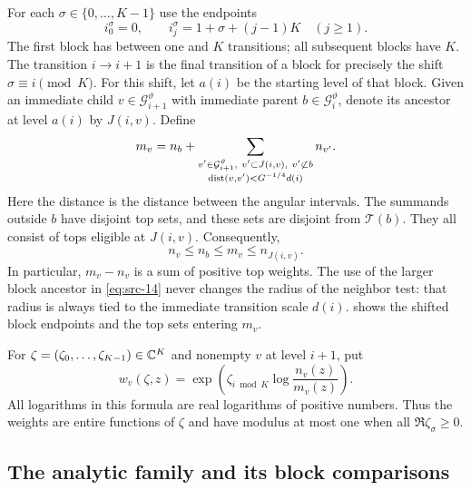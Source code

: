 For each $\sigma\in\{0,\ldots,K-1\}$ use the endpoints
\begin{equation}
 i_0^\sigma=0,
 \qquad i_j^\sigma=1+\sigma+(j-1)K\quad(j\ge1).
 \label{hier:shifted-blocks}
\end{equation}
The first block has between one and $K$ transitions; all subsequent blocks
have $K$.  The transition $i\to i+1$ is the final transition of a block
for precisely the shift $\sigma\equiv i\pmod K$.  For this shift, let
$a(i)$ be the starting level of that block.  Given an immediate child
$v\in\mathcal G_{i+1}^\vartheta$ with immediate parent
$b\in\mathcal G_i^\vartheta$, denote its ancestor at level $a(i)$ by
$J(i,v)$.  Define
\begin{equation}
 m_v=n_b+
 \sum_{\substack{v'\in\mathcal G_{i+1}^\vartheta,
                    \ v'\subset J(i,v),\ v'\not\subset b\\
                    \operatorname{dist}(v,v')<G^{-1/4}d(i)}}n_{v'}.
 \label{eq:src-14}
\end{equation}
Here the distance is the distance between the angular intervals.  The
summands outside $b$ have disjoint top sets, and these sets are disjoint
from $\mathcal T(b)$.  They all consist of tops eligible at $J(i,v)$.
Consequently,
\begin{equation}
 n_v\le n_b\le m_v\le n_{J(i,v)}.
 \label{hier:boundary-mass-bounds}
\end{equation}
In particular, $m_v-n_v$ is a sum of positive top weights.  The use of the
larger block ancestor in \eqref{eq:src-14} never changes the radius of
the neighbor test: that radius is always tied to the immediate transition
scale $d(i)$.
 shows the shifted block endpoints and the top
sets entering $m_v$.



For $\zeta=(\zeta_0,\ldots,\zeta_{K-1})\in\mathbb C^K$ and nonempty $v$ at
level $i+1$, put
\begin{equation}
 w_v(\zeta,z)
 =\exp\!\left(\zeta_{i\bmod K}\log\frac{n_v(z)}{m_v(z)}\right).
 \label{hier:analytic-transition}
\end{equation}
All logarithms in this formula are real logarithms of positive numbers.
Thus the weights are entire functions of $\zeta$ and have modulus at
most one when all $\Re\zeta_\sigma\ge0$.

\subsection{The analytic family and its block comparisons}

